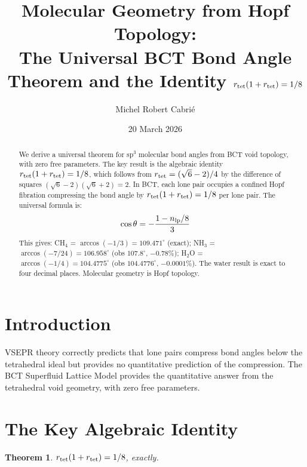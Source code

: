 \documentclass[aps,prl,twocolumn,showpacs,superscriptaddress]{revtex4-2}
\newtheorem{theorem}{Theorem}
\begin{document}
\title{Molecular Geometry from Hopf Topology:\\
The Universal BCT Bond Angle Theorem and the Identity
$r_{\rm tet}(1+r_{\rm tet}) = 1/8$}

\author{Michel Robert Cabri\'e}

\date{20 March 2026}

\begin{abstract}
We derive a universal theorem for sp$^3$ molecular bond angles from BCT 
void topology, with zero free parameters. The key result is the algebraic 
identity $r_{\rm tet}(1+r_{\rm tet}) = 1/8$, which follows from 
$r_{\rm tet} = (\sqrt{6}-2)/4$ by the difference of squares 
$(\sqrt{6}-2)(\sqrt{6}+2) = 2$. In BCT, each lone pair occupies a confined 
Hopf fibration compressing the bond angle by $r_{\rm tet}(1+r_{\rm tet}) 
= 1/8$ per lone pair. The universal formula is:
\begin{equation*}
    \cos\theta = -\frac{1 - n_{\rm lp}/8}{3}
\end{equation*}
This gives: CH$_4$ = $\arccos(-1/3) = 109.471^\circ$ (exact); 
NH$_3$ = $\arccos(-7/24) = 106.958^\circ$ (obs $107.8^\circ$, $-0.78\%$); 
H$_2$O = $\arccos(-1/4) = 104.4775^\circ$ (obs $104.4776^\circ$, $-0.0001\%$). 
The water result is exact to four decimal places. 
Molecular geometry is Hopf topology.
\end{abstract}

\maketitle

\section{Introduction}

VSEPR theory correctly predicts that lone pairs compress bond angles below 
the tetrahedral ideal but provides no quantitative prediction of the 
compression. The BCT Superfluid Lattice Model provides the quantitative 
answer from the tetrahedral void geometry, with zero free parameters.

\section{The Key Algebraic Identity}

\begin{theorem}
$r_{\rm tet}(1+r_{\rm tet}) = 1/8$, exactly.
\end{theorem}
\end{document}
